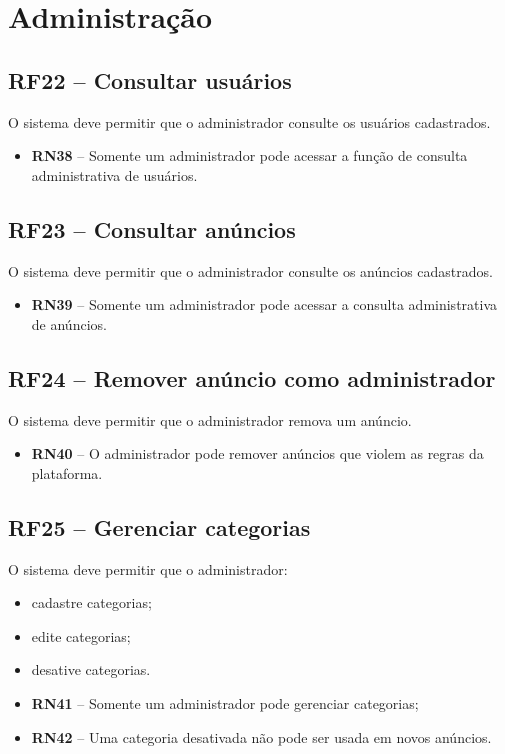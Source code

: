 \documentclass{scrreprt}
\newenvironment{fieldlist}
	{\renewcommand{\labelitemi}{--}\begin{itemize}}
	{\end{itemize}}
\begin{document}
\section{Administração}

\subsection{RF22 -- Consultar usuários}
O sistema deve permitir que o administrador consulte os usuários cadastrados.
\begin{itemize}
	\item \textbf{RN38} -- Somente um administrador pode acessar a função de consulta administrativa de usuários.
\end{itemize}

\subsection{RF23 -- Consultar anúncios}
O sistema deve permitir que o administrador consulte os anúncios cadastrados.
\begin{itemize}
	\item \textbf{RN39} -- Somente um administrador pode acessar a consulta administrativa de anúncios.
\end{itemize}

\subsection{RF24 -- Remover anúncio como administrador}
O sistema deve permitir que o administrador remova um anúncio.
\begin{itemize}
	\item \textbf{RN40} -- O administrador pode remover anúncios que violem as regras da plataforma.
\end{itemize}

\subsection{RF25 -- Gerenciar categorias}
O sistema deve permitir que o administrador:
\begin{fieldlist}
	\item cadastre categorias;
	\item edite categorias;
	\item desative categorias.
\end{fieldlist}

\begin{itemize}
	\item \textbf{RN41} -- Somente um administrador pode gerenciar categorias;
	\item \textbf{RN42} -- Uma categoria desativada não pode ser usada em novos anúncios.
\end{itemize}
\end{document}
